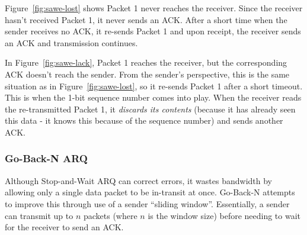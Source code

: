 \documentclass[a4paper]{article}
\numberwithin{figure}{section}
\numberwithin{table}{section}
\begin{document}
Figure~\ref{fig:sawe-lost} shows Packet 1 never reaches the receiver. Since the receiver hasn't received Packet 1, it never sends an ACK. After a short time when the sender receives no ACK, it re-sends Packet 1 and upon receipt, the receiver sends an ACK and transmission continues.

In Figure~\ref{fig:sawe-lack}, Packet 1 reaches the receiver, but the corresponding ACK doesn't reach the sender. From the sender's perspective, this is the same situation as in Figure~\ref{fig:sawe-lost}, so it re-sends Packet 1 after a short timeout. This is when the 1-bit sequence number comes into play. When the receiver reads the re-transmitted Packet 1, it \textit{discards its contents} (because it has already seen this data - it knows this because of the sequence number) and sends another ACK.

\newpage
\subsubsection{Go-Back-N ARQ} \label{sec:gbn}
Although Stop-and-Wait ARQ can correct errors, it wastes bandwidth by allowing only a single data packet to be in-transit at once. Go-Back-N attempts to improve this through use of a sender ``sliding window''. Essentially, a sender can transmit up to $n$ packets (where $n$ is the window size) before needing to wait for the receiver to send an ACK.
\end{document}
